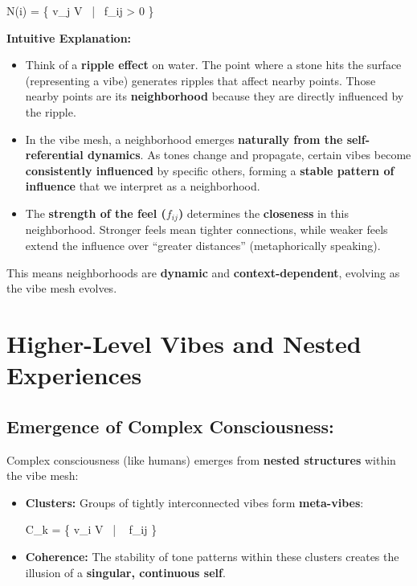 \documentclass{article}
\let\oldequation\equation
\let\endoldequation\endequation
\renewenvironment{equation}{%
    \noindent\vspace{-\parskip}\vspace{-\baselineskip}%
    \oldequation
}{%
    \endoldequation
    \noindent\vspace{-\parskip}\vspace{-\baselineskip}%
}
\theoremstyle{definition}
\begin{document}
\begin{equation}
N(i) = \{ v_j \in V \ | \ f_{ij} > 0 \}
\end{equation}

\textbf{Intuitive Explanation:}

\begin{itemize}
\item Think of a \textbf{ripple effect} on water. The point where a stone hits the surface (representing a vibe) generates ripples that affect nearby points. Those nearby points are its \textbf{neighborhood} because they are directly influenced by the ripple.
\item In the vibe mesh, a neighborhood emerges \textbf{naturally from the self-referential dynamics}. As tones change and propagate, certain vibes become \textbf{consistently influenced} by specific others, forming a \textbf{stable pattern of influence} that we interpret as a neighborhood.
\item The \textbf{strength of the feel ($f_{ij}$)} determines the \textbf{closeness} in this neighborhood. Stronger feels mean tighter connections, while weaker feels extend the influence over \enquote{greater distances} (metaphorically speaking).
\end{itemize}

This means neighborhoods are \textbf{dynamic} and \textbf{context-dependent}, evolving as the vibe mesh evolves.

\section{Higher-Level Vibes and Nested Experiences}

\subsection{Emergence of Complex Consciousness:}

Complex consciousness (like humans) emerges from \textbf{nested structures} within the vibe mesh:

\begin{itemize}
\item \textbf{Clusters:} Groups of tightly interconnected vibes form \textbf{meta-vibes}:

\begin{equation}
C_k = \{ v_i \in V \ | \  f_{ij} \}
\end{equation}

\item \textbf{Coherence:} The stability of tone patterns within these clusters creates the illusion of a \textbf{singular, continuous self}.
\end{itemize}
\end{document}

